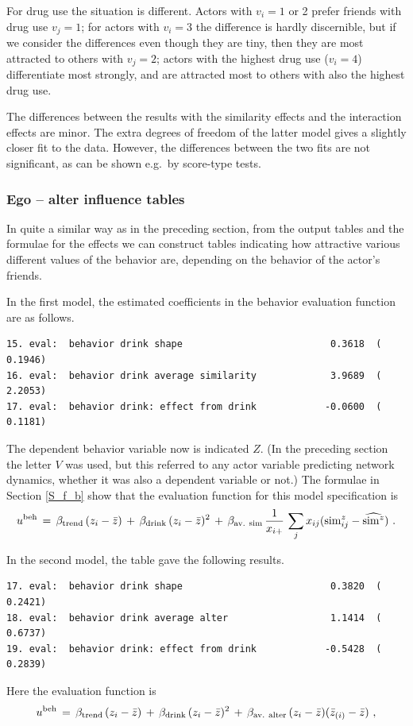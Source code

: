 \documentclass[a4paper,fleqn]{article}
\newcommand{\+}{\, + \,}
\begin{document}
{For drug use the situation is different.
Actors with $v_i = 1$ or 2 prefer friends with drug use $v_j = 1$;
for actors with $v_i = 3$ the difference is hardly discernible,
but if we consider the differences even though they are tiny,
then they are most attracted to others with $v_j = 2$;
actors with the highest drug use ($v_i = 4$) differentiate most strongly,
and are attracted most to others with also the highest drug use.

The differences between the results with the similarity effects and the
interaction effects are minor. The extra degrees of freedom of the
latter model gives a slightly closer fit to the data.
However, the differences between the two fits are not significant,
as can be shown e.g.\ by score-type tests.

\subsubsection{Ego -- alter influence tables}

In quite a similar way as in the preceding section,
from the output tables and the formulae for the effects
we can construct tables indicating how attractive
various different values of the behavior are,
depending on the behavior of the actor's friends.

In the first model, the estimated coefficients in the
behavior evaluation function are as follows.
\begin{verbatim}
15. eval:  behavior drink shape                          0.3618  (   0.1946)
16. eval:  behavior drink average similarity             3.9689  (   2.2053)
17. eval:  behavior drink: effect from drink            -0.0600  (   0.1181)
\end{verbatim}
The dependent behavior variable now is indicated $Z$. (In the preceding
section the letter $V$ was used, but this referred to any actor variable
predicting network dynamics,
whether it was also a dependent variable or not.)
The formulae in Section \ref{S_f_b} show that the evaluation function
for this model specification is
\begin{equation}
   u^{\rm beh} \,=\, \beta_{\rm trend} \, (z_i - \bar z) \,+\, \beta_{\rm drink} \, (z_i - \bar z)^2 \,+\,
                   \beta_{\rm av.\ sim}\,  \frac{1}{x_{i+}} \,
                    \sum_j x_{ij} ({\rm sim}^z_{ij} - \widehat{{\rm sim}^z}) \ .
                    \label{eq_f_b1}
\end{equation}

\noindent
In the second model, the table gave the following results.
\begin{verbatim}
17. eval:  behavior drink shape                          0.3820  (   0.2421)
18. eval:  behavior drink average alter                  1.1414  (   0.6737)
19. eval:  behavior drink: effect from drink            -0.5428  (   0.2839)
\end{verbatim}
Here the evaluation function is
\begin{equation}
   u^{\rm beh} \,=\, \beta_{\rm trend} \, (z_i - \bar z) \,+\, \beta_{\rm drink} \, (z_i - \bar z)^2 \,+\,
                   \beta_{\rm av.\ alter}\,  (z_i - \bar z)(\bar z_{(i)} - \bar z)  \ ,
                    \label{eq_f_b2}
\end{equation}

}
\end{document}
